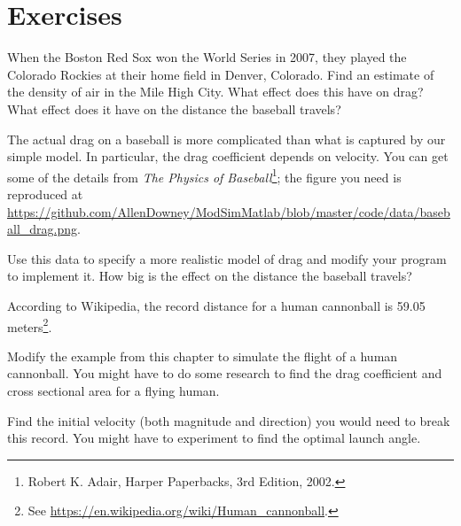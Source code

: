 \documentclass[
]{book}
\numberwithin{Answer}{chapter}
\numberwithin{Exercise}{chapter}
\begin{document}
\section{Exercises}

\begin{ex}


When the Boston Red Sox won the World Series in 2007, they played the
Colorado Rockies at their home field in Denver, Colorado.  Find an
estimate of the density of air in the Mile High City.  What effect
does this have on drag?  What effect does it have on the distance the baseball travels?
\end{ex}

\begin{ex}


The actual drag on a baseball is more complicated than what is
captured by our simple model.  In particular, the drag coefficient
depends on velocity.  You can get some of the details from {\em The
Physics of Baseball}\footnote{Robert K. Adair, Harper Paperbacks, 3rd
Edition, 2002.}; the figure you need is reproduced at \url{https://github.com/AllenDowney/ModSimMatlab/blob/master/code/data/baseball_drag.png}.

Use this data to specify a more realistic model of drag and modify your
program to implement it.  How big is the effect on the distance the baseball travels?
\end{ex}


\begin{ex}
\label{ex:cannon}


According to Wikipedia, the record distance for a human cannonball is 59.05 meters\footnote{See \url{https://en.wikipedia.org/wiki/Human_cannonball}.}.

Modify the example from this chapter to simulate the flight of a human cannonball.  You might have to do some research to find the drag coefficient and cross sectional area for a flying human.

Find the initial velocity (both magnitude and direction) you would need to break this record.  You might have to experiment to find the optimal launch angle.
\end{ex}
\end{document}
